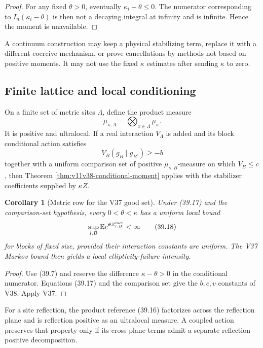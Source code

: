 \documentclass[11pt]{article}
\newtheorem{corollary}[theorem]{Corollary}
\begin{document}
\begin{proof}
For any fixed \(\theta>0\), eventually
\(\kappa_i-\theta\leq0\).  The numerator corresponding to
\(I_n(\kappa_i-\theta)\) is then not a decaying integral at infinity and
is infinite.  Hence the moment is unavailable.
\end{proof}

A continuum construction may keep a physical stabilizing term, replace
it with a different coercive mechanism, or prove cancellations by
methods not based on positive moments.  It may not use the fixed
\(\kappa\) estimates after sending \(\kappa\) to zero.

\subsection{Finite lattice and local conditioning}

On a finite set of metric sites \(\Lambda\), define the product measure
\[
 \mu_{\kappa,\Lambda}
 =
 \bigotimes_{x\in\Lambda}\mu_\kappa.
 \tag{39.16}
\]
It is positive and ultralocal.  If a real interaction \(V_\Lambda\)
is added and its block conditional action satisfies
\[
 V_B(g_B\mid g_{B^c})\geq-b
 \tag{39.17}
\]
together with a uniform comparison set of positive
\(\mu_{\kappa,B}\)-measure on which \(V_B\leq c\), then Theorem
\ref{thm:v11v38-conditional-moment} applies with the stabilizer
coefficients supplied by \(\kappa Z\).

\begin{corollary}[Metric row for the V37 good set]
\label{cor:v11v39-good-metric}
Under (39.17) and the comparison-set hypothesis, every
\(0<\theta<\kappa\) has a uniform local bound
\[
 \sup_{i,B}
 \mathbb E e^{\theta Z^{\rm met}_{i,B}}<\infty
 \tag{39.18}
\]
for blocks of fixed size, provided their interaction constants are
uniform.  The V37 Markov bound then yields a local ellipticity-failure
intensity.
\end{corollary}

\begin{proof}
Use (39.7) and reserve the difference \(\kappa-\theta>0\) in the
conditional numerator.  Equations (39.17) and the comparison set give
the \(b,c,v\) constants of V38.  Apply V37.
\end{proof}

For a site reflection, the product reference (39.16) factorizes across
the reflection plane and is reflection positive as an ultralocal
measure.  A coupled action preserves that property only if its
cross-plane terms admit a separate reflection-positive decomposition.
\end{document}
